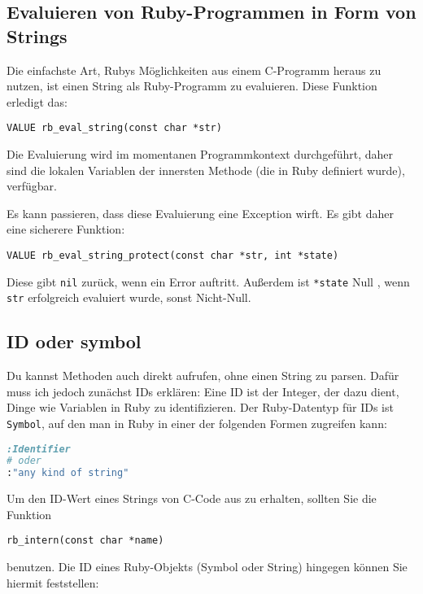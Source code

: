 \subsection{Evaluieren von Ruby-Programmen in Form von Strings}

Die einfachste Art, Rubys Möglichkeiten aus einem C-Programm heraus zu
nutzen, ist einen String als Ruby-Programm zu evaluieren. Diese
Funktion erledigt das:

\begin{lstlisting}
VALUE rb_eval_string(const char *str)
\end{lstlisting}

\noindent Die Evaluierung wird im momentanen Programmkontext
durchgeführt, daher sind die lokalen Variablen der innersten Methode
(die in Ruby definiert wurde), verfügbar.

Es kann passieren, dass diese Evaluierung eine Exception wirft. Es
gibt daher eine sicherere Funktion:

\begin{lstlisting}
VALUE rb_eval_string_protect(const char *str, int *state)
\end{lstlisting}

\noindent Diese gibt \verb+nil+ zurück, wenn ein Error
auftritt. Außerdem ist \verb+*state+ Null , wenn
\verb+str+ erfolgreich evaluiert wurde, sonst Nicht-Null.

\subsection{ID oder symbol}
\label{sec:id-oder-symbol}

Du kannst Methoden auch direkt aufrufen, ohne einen String zu
parsen. Dafür muss ich jedoch zunächst IDs erklären: Eine ID ist der
Integer, der dazu dient, Dinge wie Variablen in Ruby zu
identifizieren. Der Ruby-Datentyp für IDs ist \verb+Symbol+, auf den
man in Ruby in einer der folgenden Formen zugreifen kann:

\begin{lstlisting}[language=ruby]
:Identifier
# oder
:"any kind of string"
\end{lstlisting}

Um den ID-Wert eines Strings von C-Code aus zu erhalten, sollten Sie
die Funktion

\begin{lstlisting}
rb_intern(const char *name)
\end{lstlisting}

\noindent benutzen. Die ID eines Ruby-Objekts (Symbol oder String)
hingegen können Sie hiermit feststellen:

